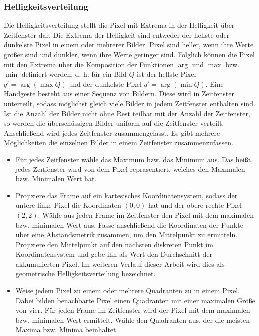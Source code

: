 \subsubsection{Helligkeitsverteilung}
Die Helligkeitsverteilung stellt die Pixel mit Extrema in der Helligkeit über Zeitfenster dar. Die Extrema der Helligkeit sind entweder der hellste oder dunkelste Pixel in einem oder mehrerer Bilder. Pixel
sind heller, wenn ihre Werte größer sind und dunkler, wenn ihre Werte geringer sind. Folglich können die Pixel mit den Extrema über die Komposition der Funktionen $\arg$ und $\max$ bzw. $\min$ definiert werden,
d. h. für ein Bild $Q$ ist der hellste Pixel $q' = \arg(\max Q)$ und der dunkelste Pixel $q' = \arg(\min Q)$.
\newline
\newline
Eine Handgeste besteht aus einer Sequenz von Bildern. Diese wird in Zeitfenster unterteilt, sodass möglichst gleich viele Bilder in jedem Zeitfenster enthalten sind. Ist die Anzahl der Bilder nicht ohne
Rest teilbar mit der Anzahl der Zeitfenster, so werden die überschüssigen Bilder uniform auf die Zeitfenster verteilt. Anschließend wird jedes Zeitfenster zusammengefasst. Es gibt mehrere Möglichkeiten
die einzelnen Bilder in einem Zeitfenster zusammenzufassen.
\begin{itemize}
    \item Für jedes Zeitfenster wähle das Maximum bzw. das Minimum aus. Das heißt, jedes Zeitfenster wird von dem Pixel repräsentiert, welches den Maximalen bzw. Minimalen Wert hat.
    \item Projiziere das Frame auf ein kartesisches Koordinatensystem, sodass der untere linke Pixel die Koordinaten $(0,0)$ hat und der obere rechte Pixel $(2,2)$. Wähle aus jeden Frame im
          Zeitfenster den Pixel mit dem maximalen bzw. minimalen Wert aus. Fasse anschließend die Koordinaten der Punkte über eine Abstandsmetrik zusammen, um den Mittelpunkt zu ermitteln. Projiziere
          den Mittelpunkt auf den nächsten diskreten Punkt im Koordinatensystem und gebe ihn als Wert den Durchschnitt der akkumulierten Pixel. Im weiteren Verlauf dieser Arbeit wird dies als geometrische
          Helligkeitsverteilung bezeichnet.
    \item Weise jedem Pixel zu einem oder mehrere Quadranten zu in einem Pixel. Dabei bilden benachbarte Pixel einen Quadranten mit einer maximalen Größe von vier. Für jeden Frame im Zeitfenster
          wird der Pixel mit dem maximalen bzw. minimalen Wert ermittelt. Wähle den Quadranten aus, der die meisten Maxima bzw. Minima beinhaltet.
\end{itemize}
